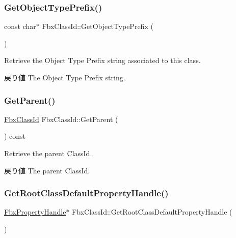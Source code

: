 \subsubsection{\texorpdfstring{Get\+Object\+Type\+Prefix()}{GetObjectTypePrefix()}}
{\footnotesize\ttfamily const char$\ast$ Fbx\+Class\+Id\+::\+Get\+Object\+Type\+Prefix (\begin{DoxyParamCaption}{ }\end{DoxyParamCaption})}

Retrieve the Object Type Prefix string associated to this class. \begin{DoxyReturn}{戻り値}
The Object Type Prefix string. 
\end{DoxyReturn}
\mbox{\label{class_fbx_class_id_a5805c5b91800c43aeab75d12398080b8}} 
\subsubsection{\texorpdfstring{Get\+Parent()}{GetParent()}}
{\footnotesize\ttfamily \hyperlink{class_fbx_class_id}{Fbx\+Class\+Id} Fbx\+Class\+Id\+::\+Get\+Parent (\begin{DoxyParamCaption}{ }\end{DoxyParamCaption}) const}

Retrieve the parent Class\+Id. \begin{DoxyReturn}{戻り値}
The parent Class\+Id. 
\end{DoxyReturn}
\mbox{\label{class_fbx_class_id_a7dc7dd00c35e2bcaa97b5296973dda44}} 
\subsubsection{\texorpdfstring{Get\+Root\+Class\+Default\+Property\+Handle()}{GetRootClassDefaultPropertyHandle()}}
{\footnotesize\ttfamily \hyperlink{class_fbx_property_handle}{Fbx\+Property\+Handle}$\ast$ Fbx\+Class\+Id\+::\+Get\+Root\+Class\+Default\+Property\+Handle (\begin{DoxyParamCaption}{ }\end{DoxyParamCaption})}

